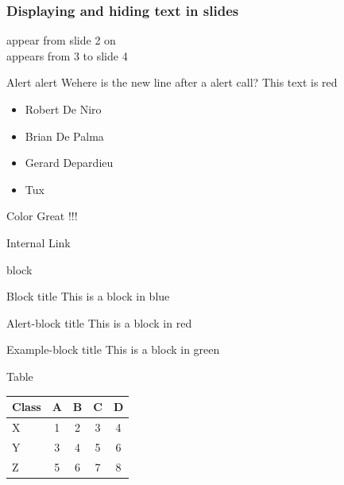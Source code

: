 \documentclass{Beamer}
\begin{document}
\begin{frame}
  \frametitle{Displaying and hiding text in slides}
  {appear from slide 2 on\\}
  {appears from 3 to slide 4\\}
\end{frame}

\begin{frame}{Alert}
  \alert{alert}
  Wehere is the new line after a alert call?
  \alert<1>{This text} \alert<2>{is} \alert<3>{red}
  \begin{itemize}
  \item <+-| alert@+> Robert De Niro
  \item <+-| alert@+> Brian De Palma
  \item <+-| alert@+> Gerard Depardieu
  \item <+-| alert@+> Tux
  \end{itemize}
\end{frame}

\begin{frame}{Color}
Great !!!
\end{frame}

\begin{frame}{Internal Link}
  \hyperlink{titlepage}{}
\end{frame}

\begin{frame}{block}

  \begin{block}{Block title}
    This is a block in blue
  \end{block}

  \begin{alertblock}{Alert-block title}
    This is a block in red
  \end{alertblock}

  \begin{exampleblock}{Example-block title}
    This is a block in green
  \end{exampleblock}
\end{frame}

\begin{frame}{Table}
\begin{tabular}{lcccc}
  Class & A & B & C & D \\\hline
  X     & 1 & 2 & 3 & 4 \pause\\
  Y     & 3 & 4 & 5 & 6 \pause\\
  Z     &5&6&7&8
\end{tabular}
\end{frame}
\end{document}
